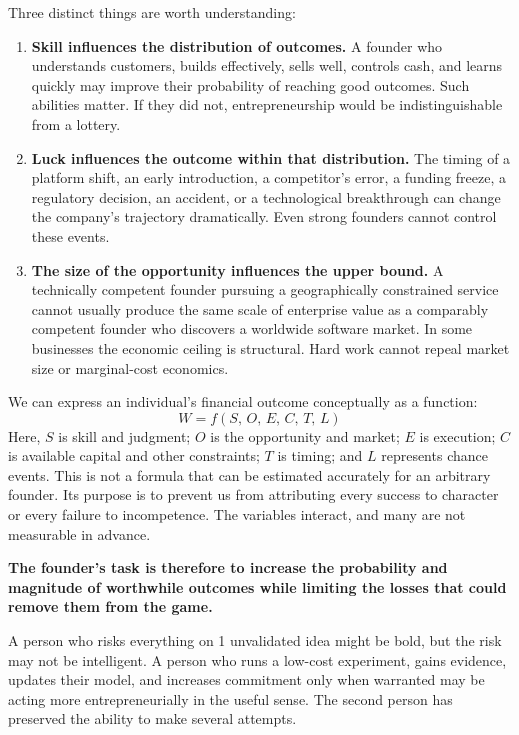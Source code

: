 Three distinct things are worth understanding:
\begin{enumerate}[label=\textbf{\arabic*.},leftmargin=11pt,itemsep=1.5pt,topsep=1.5pt,parsep=0pt]
  \item \textbf{Skill influences the distribution of outcomes.} A founder who understands customers, builds effectively, sells well, controls cash, and learns quickly may improve their probability of reaching good outcomes. Such abilities matter. If they did not, entrepreneurship would be indistinguishable from a lottery.
  \item \textbf{Luck influences the outcome within that distribution.} The timing of a platform shift, an early introduction, a competitor's error, a funding freeze, a regulatory decision, an accident, or a technological breakthrough can change the company's trajectory dramatically. Even strong founders cannot control these events.
  \item \textbf{The size of the opportunity influences the upper bound.} A technically competent founder pursuing a geographically constrained service cannot usually produce the same scale of enterprise value as a comparably competent founder who discovers a worldwide software market. In some businesses the economic ceiling is structural. Hard work cannot repeal market size or marginal-cost economics.
\end{enumerate}

We can express an individual's financial outcome conceptually as a function:
\begin{equation}
  W = f(S, \, O, \, E, \, C, \, T, \, L) \label{eq:wealth-function}
\end{equation}
Here, $S$ is skill and judgment; $O$ is the opportunity and market; $E$ is execution; $C$ is available capital and other constraints; $T$ is timing; and $L$ represents chance events. This is not a formula that can be estimated accurately for an arbitrary founder. Its purpose is to prevent us from attributing every success to character or every failure to incompetence. The variables interact, and many are not measurable in advance.

\textbf{The founder's task is therefore to increase the probability and magnitude of worthwhile outcomes while limiting the losses that could remove them from the game.}

A person who risks everything on 1 unvalidated idea might be bold, but the risk may not be intelligent. A person who runs a low-cost experiment, gains evidence, updates their model, and increases commitment only when warranted may be acting more entrepreneurially in the useful sense. The second person has preserved the ability to make several attempts.

